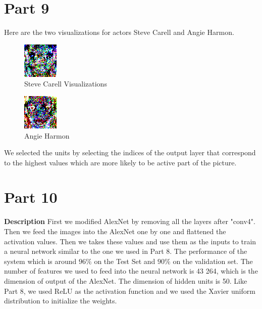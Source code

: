 \documentclass[10pt,letterpaper]{article}
\begin{document}
	\section{Part 9}
	Here are the two visualizations for actors Steve Carell and Angie Harmon.

	\begin{figure}[H]
		\centering
		\includegraphics[width=0.5\linewidth]{Part9-Carell.png}
		\caption{Steve Carell Visualizations}
		\label{fig:part9}
	\end{figure}

	\begin{figure}[H]
		\centering
		\includegraphics[width=0.5\linewidth]{Part9-Harmon.png}
		\caption{Angie Harmon}
		\label{fig:part9}
	\end{figure}

	We selected the units by selecting the indices of the output layer that correspond to the highest values which are more likely to be active part of the picture.

	\section{Part 10}

	\textbf{Description}
	First we modified AlexNet by removing all the layers after "conv4". Then we feed the images into the AlexNet one by one and flattened the activation values. Then we takes these values and use them as the inputs to train a neural network similar to the one we used in Part 8. The performance of the system which is around $96\%$ on the Test Set and $90\%$ on the validation set. The number of features we used to feed into the neural network is 43 264, which is the dimension of output of the AlexNet. The dimension of hidden units is 50. Like Part 8, we used ReLU as the activation function and we used the Xavier uniform distribution to initialize the weights.
\end{document}
